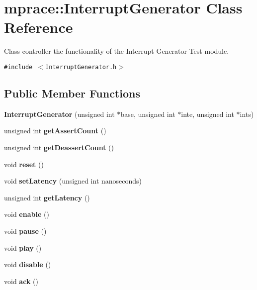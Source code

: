 \hypertarget{classmprace_1_1InterruptGenerator}{
\section{mprace::Interrupt\-Generator Class Reference}
\label{classmprace_1_1InterruptGenerator}
}
Class controller the functionality of the Interrupt Generator Test module.  


{\tt \#include $<$Interrupt\-Generator.h$>$}

\subsection*{Public Member Functions}
\begin{CompactItemize}
\item 
\hypertarget{classmprace_1_1InterruptGenerator_a0}{
{\bf Interrupt\-Generator} (unsigned int $\ast$base, unsigned int $\ast$inte, unsigned int $\ast$ints)}
\label{classmprace_1_1InterruptGenerator_a0}

\item 
\hypertarget{classmprace_1_1InterruptGenerator_a2}{
unsigned int {\bf get\-Assert\-Count} ()}
\label{classmprace_1_1InterruptGenerator_a2}

\item 
\hypertarget{classmprace_1_1InterruptGenerator_a3}{
unsigned int {\bf get\-Deassert\-Count} ()}
\label{classmprace_1_1InterruptGenerator_a3}

\item 
\hypertarget{classmprace_1_1InterruptGenerator_a4}{
void {\bf reset} ()}
\label{classmprace_1_1InterruptGenerator_a4}

\item 
\hypertarget{classmprace_1_1InterruptGenerator_a5}{
void {\bf set\-Latency} (unsigned int nanoseconds)}
\label{classmprace_1_1InterruptGenerator_a5}

\item 
\hypertarget{classmprace_1_1InterruptGenerator_a6}{
unsigned int {\bf get\-Latency} ()}
\label{classmprace_1_1InterruptGenerator_a6}

\item 
\hypertarget{classmprace_1_1InterruptGenerator_a7}{
void {\bf enable} ()}
\label{classmprace_1_1InterruptGenerator_a7}

\item 
\hypertarget{classmprace_1_1InterruptGenerator_a8}{
void {\bf pause} ()}
\label{classmprace_1_1InterruptGenerator_a8}

\item 
\hypertarget{classmprace_1_1InterruptGenerator_a9}{
void {\bf play} ()}
\label{classmprace_1_1InterruptGenerator_a9}

\item 
\hypertarget{classmprace_1_1InterruptGenerator_a10}{
void {\bf disable} ()}
\label{classmprace_1_1InterruptGenerator_a10}

\item 
\hypertarget{classmprace_1_1InterruptGenerator_a11}{
void {\bf ack} ()}
\label{classmprace_1_1InterruptGenerator_a11}

\end{CompactItemize}

